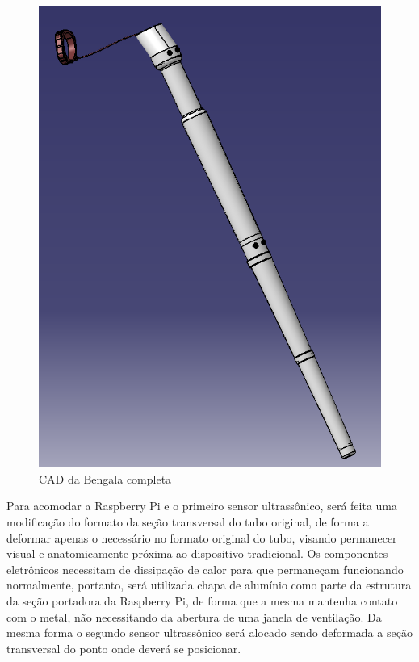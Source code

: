 \begin{figure}[H]
\includegraphics[scale=0.5]{figuras/bengala/bengalacompleta.PNG}
\centering
\caption{CAD da Bengala completa}
\label{fig:sensor.jpg}
\end{figure}

Para acomodar a Raspberry Pi e o primeiro sensor ultrassônico, será feita uma modificação do formato da seção transversal do tubo original, de forma a deformar apenas o necessário no formato original do tubo, visando permanecer visual e anatomicamente próxima ao dispositivo tradicional. Os componentes eletrônicos necessitam de dissipação de calor para que permaneçam funcionando normalmente, portanto, será utilizada chapa de alumínio como parte da estrutura da seção portadora da Raspberry Pi, de forma que a mesma mantenha contato com o metal, não necessitando da abertura de uma janela de ventilação. Da mesma forma o segundo sensor ultrassônico será alocado sendo deformada a seção transversal do ponto onde deverá se posicionar.


